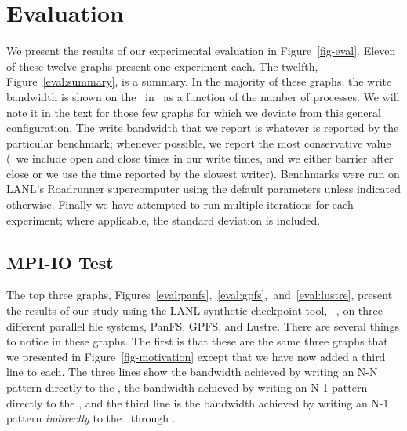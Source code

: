 \section{Evaluation}
\label{eval}



We present the results of our experimental evaluation in Figure~\ref{fig-eval}.
Eleven of these twelve graphs present one experiment each. The twelfth,
Figure~\ref{eval:summary}, is a summary. In the majority of these graphs, the
write bandwidth is shown on the \yaxis\ in \MBs\ as a function of the number of
processes. We will note it in the text for those few graphs for which we
deviate from this general configuration. The write bandwidth that we report is
whatever is reported by the particular benchmark; whenever possible, we report
the most conservative value (\ie\ we include open and close times in our write
times, and we either barrier after close or we use the time reported by the
slowest writer). Benchmarks were run on LANL's Roadrunner supercomputer using
the default parameters unless indicated otherwise.  Finally we have attempted
to run multiple iterations for each experiment; where applicable, the standard
deviation is included.

\subsection{MPI-IO Test}

The top three graphs, 
Figures~\ref{eval:panfs},~\ref{eval:gpfs},~and~\ref{eval:lustre}, present the
results of our study using the LANL synthetic checkpoint tool, ~\cite{mpi-io-test}, on three different parallel file systems, PanFS, GPFS,
and Lustre. 
There are several things to notice in these graphs. The first is that these
are the same three graphs that we presented in Figure~\ref{fig-motivation}
except that we have now added a third line to each. The three lines show the
bandwidth achieved by writing an N-N pattern directly to the \upfs, the
bandwidth achieved by writing an N-1 pattern directly to the \upfs, and the
third line is the bandwidth achieved by writing an N-1 pattern {\em indirectly}
to the \upfs\ through \plfs.

